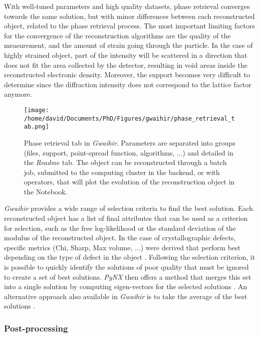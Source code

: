 With well-tuned parameters and high quality datasets, phase retrieval converges towards the same solution, but with minor differences between each reconstructed object, related to the phase retrieval process.
The most important limiting factors for the convergence of the reconstruction algorithms are the quality of the measurement, and the amount of strain going through the particle.
In the case of highly strained object, part of the intensity will be scattered in a direction that does not fit the area collected by the detector, resulting in void areas inside the reconstructed electronic density.
Moreover, the support becomes very difficult to determine since the diffraction intensity does not correspond to the lattice factor anymore.

\begin{figure}[!htb]
    \centering
    \texttt{[image: /home/david/Documents/PhD/Figures/gwaihir/phase\_retrieval\_tab.png]}
    \caption{
    Phase retrieval tab in \textit{Gwaihir}.
    Parameters are separated into groups (files, support, point-spread function, algorithms, ...) and detailed in the \textit{Readme} tab.
    The object can be reconstructed through a batch job, submitted to the computing cluster in the backend, or with operators, that will plot the evolution of the reconstruction object in the Notebook.
    }
    \label{fig:PRT}
\end{figure}

\textit{Gwaihir} provides a wide range of selection criteria to find the best solution.
Each reconstructed object has a list of final attributes that can be used as a criterion for selection, such as the free log-likelihood \parencite{FavreNicolin2020a} or the standard deviation of the modulus of the reconstructed object.
In the case of crystallographic defects, specific metrics (Chi, Sharp, Max volume, ...) were derived that perform best depending on the type of defect in the object \parencite{Ulvestad2017}.
Following the selection criterion, it is possible to quickly identify the solutions of poor quality that must be ignored to create a set of best solutions.
\textit{PyNX} then offers a method that merges this set into a single solution by computing eigen-vectors for the selected solutions \parencite{FavreNicolin2020}.
An alternative approach also available in \textit{Gwaihir} is to take the average of the best solutions \parencite{Ulvestad2014}.

\subsubsection{Post-processing} \label{sec:postprocess}

